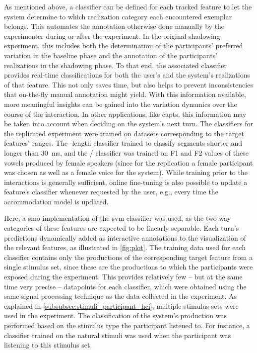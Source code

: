 As mentioned above, a classifier can be defined for each tracked feature to let the system determine to which realization category each encountered exemplar belongs.
This automates the annotation otherwise done manually by the experimenter during or after the experiment.
In the original shadowing experiment, this includes both the determination of the participants' preferred variation in the baseline phase and the annotation of the participants' realizations in the shadowing phase.
To that end, the associated classifier provides real-time classifications for both the user's and the system's realizations of that feature.
This not only saves time, but also helps to prevent inconsistencies that on-the-fly manual annotation might yield.
With this information available, more meaningful insights can be gained into the variation dynamics over the course of the interaction.
In other applications, like \acp{capt}, this information may be taken into account when deciding on the system's next turn.
The classifiers for the replicated experiment were trained on datasets corresponding to the target features' ranges.
The -length classifier trained to classify segments shorter and longer than \SI{30}{\milli\second}, and the \textipa{[e:]}/\textipa{[E:]} classifier was trained on F1 and F2 values of these vowels produced by female speakers (since for the replication a female participant was chosen as well as a female voice for the system).
While training prior to the interactions is generally sufficient, online fine-tuning is also possible to update a feature's classifier whenever requested by the user, e.g., every time the accommodation model is updated.

Here, a \ac{smo} \citep{Platt1999fast, Platt1998sequential} implementation of the \ac{svm} classifier \citep{Vapnik1998support, Joachims2005support} was used, as the two-way categories of these features are expected to be linearly separable.
Each turn's predictions dynamically added as interactive annotations to the visualization of the relevant features, as illustrated in \cref{fig:plot}.
The training data used for each classifier contains only the productions of the corresponding target feature from a single stimulus set, since these are the productions to which the participants were exposed during the experiment.
This provides relatively few -- but at the same time very precise -- datapoints for each classifier,
which were obtained using the same signal processing technique as the data collected in the experiment.
As explained in \cref{subsubsec:stimuli_participant_hci}, multiple stimulus sets were used in the experiment.
The classification of the system's production was performed based on the stimulus type the participant listened to.
For instance, a classifier trained on the natural stimuli was used when the participant was listening to this stimulus set.

